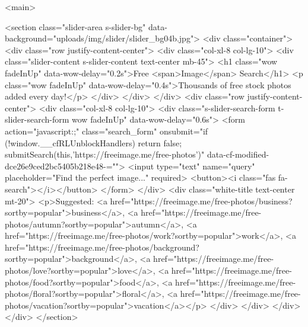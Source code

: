 <main>

<section class="slider-area s-slider-bg" data-background="uploads/img/slider/slider_bg04b.jpg">
<div class="container">
<div class="row justify-content-center">
<div class="col-xl-8 col-lg-10">
<div class="slider-content s-slider-content text-center mb-45">
<h1 class="wow fadeInUp" data-wow-delay="0.2s">Free <span>Image</span> Search</h1>
<p class="wow fadeInUp" data-wow-delay="0.4s">Thousands of free stock photos added every day!</p>
</div>
</div>
</div>
<div class="row justify-content-center">
<div class="col-xl-8 col-lg-10">
<div class="s-slider-search-form t-slider-search-form wow fadeInUp" data-wow-delay="0.6s">
<form action="javascript:;" class="search_form" onsubmit="if (!window.__cfRLUnblockHandlers) return false; submitSearch(this,'https://freeimage.me/free-photos')" data-cf-modified-dce26e9ced2bc5405b218e48-="">
<input type="text" name="query" placeholder="Find the perfect image..." required>
<button><i class="fas fa-search"></i></button>
</form>
</div>
<div class="white-title text-center mt-20">
<p>Suggested: <a href="https://freeimage.me/free-photos/business?sortby=popular">business</a>, <a href="https://freeimage.me/free-photos/autumn?sortby=popular">autumn</a>, <a href="https://freeimage.me/free-photos/work?sortby=popular">work</a>, <a href="https://freeimage.me/free-photos/background?sortby=popular">background</a>, <a href="https://freeimage.me/free-photos/love?sortby=popular">love</a>, <a href="https://freeimage.me/free-photos/food?sortby=popular">food</a>, <a href="https://freeimage.me/free-photos/floral?sortby=popular">floral</a>, <a href="https://freeimage.me/free-photos/vacation?sortby=popular">vacation</a></p>
</div>
</div>
</div>
</div>
</section>

